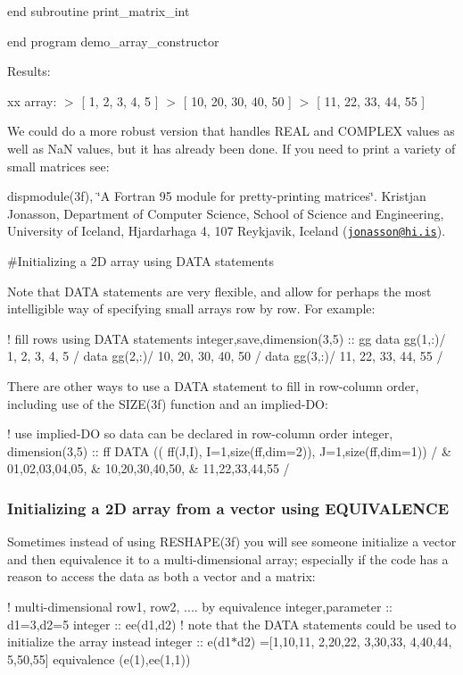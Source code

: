 end subroutine print\+\_\+matrix\+\_\+int

end program demo\+\_\+array\+\_\+constructor

Results\+:

xx array\+: $>$ \mbox{[} 1, 2, 3, 4, 5 \mbox{]} $>$ \mbox{[} 10, 20, 30, 40, 50 \mbox{]} $>$ \mbox{[} 11, 22, 33, 44, 55 \mbox{]}

We could do a more robust version that handles R\+E\+AL and C\+O\+M\+P\+L\+EX values as well as NaN values, but it has already been done. If you need to print a variety of small matrices see\+:

dispmodule(3f), \char`\"{}\+A Fortran 95 module for pretty-\/printing matrices\char`\"{}. Kristjan Jonasson, Department of Computer Science, School of Science and Engineering, University of Iceland, Hjardarhaga 4, 107 Reykjavik, Iceland (\href{mailto:jonasson@hi.is}{\tt jonasson@hi.\+is}).

\#\+Initializing a 2D array using D\+A\+TA statements

Note that D\+A\+TA statements are very flexible, and allow for perhaps the most intelligible way of specifying small arrays row by row. For example\+:

! fill rows using D\+A\+TA statements integer,save,dimension(3,5) \+:\+: gg data gg(1,\+:)/ 1, 2, 3, 4, 5 / data gg(2,\+:)/ 10, 20, 30, 40, 50 / data gg(3,\+:)/ 11, 22, 33, 44, 55 /

There are other ways to use a D\+A\+TA statement to fill in row-\/column order, including use of the S\+I\+Z\+E(3f) function and an implied-\/\+DO\+:

! use implied-\/\+DO so data can be declared in row-\/column order integer, dimension(3,5) \+:\+: ff D\+A\+TA (( ff(\+J,\+I), I=1,size(ff,dim=2)), J=1,size(ff,dim=1)) / \& 01,02,03,04,05, \& 10,20,30,40,50, \& 11,22,33,44,55 /

\subsubsection*{Initializing a 2D array from a vector using E\+Q\+U\+I\+V\+A\+L\+E\+N\+CE}

Sometimes instead of using R\+E\+S\+H\+A\+P\+E(3f) you will see someone initialize a vector and then equivalence it to a multi-\/dimensional array; especially if the code has a reason to access the data as both a vector and a matrix\+:

! multi-\/dimensional row1, row2, .... by equivalence integer,parameter \+:\+: d1=3,d2=5 integer \+:\+: ee(d1,d2) ! note that the D\+A\+TA statements could be used to initialize the array instead integer \+:\+: e(d1$\ast$d2) =\mbox{[}1,10,11, 2,20,22, 3,30,33, 4,40,44, 5,50,55\mbox{]} equivalence (e(1),ee(1,1))

